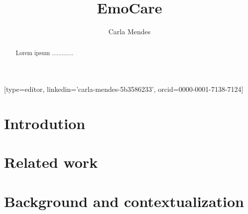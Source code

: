 \documentclass[a4paper,fleqn]{cas-dc}
\begin{document}
\let\WriteBookmarks\relax
\def\floatpagepagefraction{1}
\def\textpagefraction{.001}

\title [mode = title]{EmoCare}                     


\author[1]{Carla Mendes}[type=editor,
		linkedin='carla-mendes-5b3586233',
		orcid=0000-0001-7138-7124]

\address[1]{Computer Science and Communications Research Centre, School of Technology and Management, Polytechnic of Leiria, 2411-901 Leiria, Portugal}

\begin{abstract}
Lorem ipsum .............


\end{abstract}

%

\begin{keywords}

\end{keywords}


\maketitle

\section{Introdution}
\label{introduction}

\section{Related work}
\label{relatedWork}

\section{Background and contextualization}
\label{backgroundContextualization}
\end{document}

